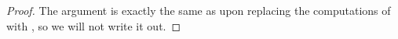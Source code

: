 \begin{proof}
    The argument is exactly the same as  upon replacing the computations of  with , so we will not write it out.
\end{proof}